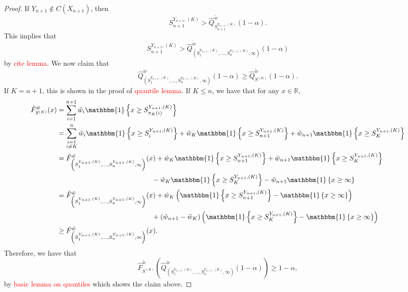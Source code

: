 \documentclass[11pt, titlepage]{article} %
\newcommand{\Ind}[1]{\mathbbm{1}\left\{ #1 \right\}}
\numberwithin{equation}{section}
\theoremstyle{definition}
\numberwithin{theorem}{section}
\numberwithin{lemma}{section}
\numberwithin{corollary}{section}
\numberwithin{proposition}{section}
\numberwithin{definition}{section}
\numberwithin{remark}{section}
\begin{document}
\begin{proof}
    If \(Y_{n+1} \not \in C(X_{n+1})\), then \[S_{n+1}^{Y_{n+1}, (K)} > \hat{Q}^{\tilde{w}}_{S_{n+1}^{Y_{n+1}, (K)}}(1-\alpha).\] This implies that \[S_{n+1}^{Y_{n+1}, (K)} > \hat{Q}^{\tilde{w}}_{\left( S_1^{Y_{n+1}, (K)}, \ldots, S_n^{Y_{n+1}, (K)}, \infty  \right)}(1-\alpha)\] by \textcolor{red}{cite lemma}. We now claim that \[\hat{Q}^{\tilde{w}}_{\left( S_1^{Y_{n+1}, (K)}, \ldots, S_n^{Y_{n+1}, (K)}, \infty  \right)}(1-\alpha) \geq \hat{Q}^{\tilde{w}}_{S^{(K)}}(1-\alpha).\] If \(K = n+1\), this is shown in the proof of \textcolor{red}{quantile lemma}. If \(K \leq n\), we have that for any \(x \in \mathbb{R}\), \begin{align*}
        \hat{F}^{\tilde{w}}_{S^{(K)}}(x) &= \sum_{i=1}^{n+1} \tilde{w}_i \Ind{x \geq S_{\pi_K(i)}^{Y_{n+1}, (K)}} \\
        &= \sum_{\substack{i = 1 \\ i \neq K}}^{n} \tilde{w}_i \Ind{x \geq S_i^{Y_{n+1}, (K)}} + \tilde{w}_K \Ind{x \geq S_{n+1}^{Y_{n+1}, (K)}} + \tilde{w}_{n+1} \Ind{x \geq S_K^{Y_{n+1}, (K)}} \\
        &= \hat{F}^{\tilde{w}}_{\left( S_1^{Y_{n+1}, (K)}, \ldots, S_n^{Y_{n+1}, (K)}, \infty  \right)}(x) + \tilde{w}_K \Ind{x \geq S_{n+1}^{Y_{n+1}, (K)}} + \tilde{w}_{n+1} \Ind{x \geq S_K^{Y_{n+1}, (K)}} \\
        & \hspace{4.8cm} -  \tilde{w}_K \Ind{x \geq S_{K}^{Y_{n+1}, (K)}} - \tilde{w}_{n+1} \Ind{x \geq \infty} \\
        &= \hat{F}^{\tilde{w}}_{\left( S_1^{Y_{n+1}, (K)}, \ldots, S_n^{Y_{n+1}, (K)}, \infty  \right)}(x) + \tilde{w}_K \left (\Ind{x \geq S_{n+1}^{Y_{n+1}, (K)}} - \Ind{x \geq \infty} \right) \\
        & \hspace{4.8cm} + \left( \tilde{w}_{n+1} - \tilde{w}_K\right) \left(\Ind{x \geq S_{K}^{Y_{n+1}, (K)}} - \Ind{x \geq \infty} \right) \\
        & \geq \hat{F}^{\tilde{w}}_{\left( S_1^{Y_{n+1}, (K)}, \ldots, S_n^{Y_{n+1}, (K)}, \infty  \right)}(x).
    \end{align*}
    Therefore, we have that \[\hat{F}^{\tilde{w}}_{S^{(K)}}\left( \hat{Q}^{\tilde{w}}_{\left( S_1^{Y_{n+1}, (K)}, \ldots, S_n^{Y_{n+1}, (K)}, \infty  \right)}(1-\alpha) \right) \geq 1-\alpha,\] by \textcolor{red}{basic lemma on quantiles} which shows the claim above. \vskip5pt


\end{proof}
\end{document}
